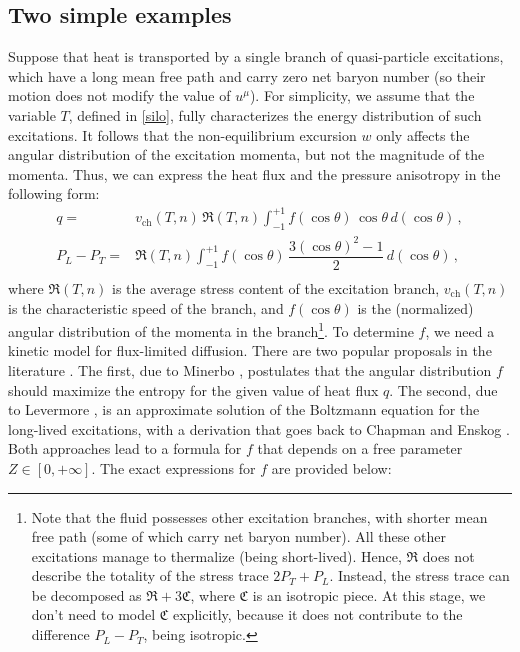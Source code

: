 \documentclass[a4paper, amsfonts, amssymb, amsmath, reprint, showkeys, nofootinbib, twoside, onecolumn, notitlepage]{revtex4-1}
\begin{document}
\subsection{Two simple examples}\label{ortega}

Suppose that heat is transported by a single branch of quasi-particle excitations, which have a long mean free path and carry zero net baryon number (so their motion does not modify the value of $u^\mu$). For simplicity, we assume that the variable $T$, defined in \eqref{silo}, fully characterizes the energy distribution of such excitations. It follows that the non-equilibrium excursion $w$ only affects the angular distribution of the excitation momenta, but not the magnitude of the momenta. Thus, we can express the heat flux and the pressure anisotropy in the following form:
\begin{equation}\label{finalmente}
    \begin{split}
q={}& v_{\text{ch}}(T,n) \, \mathfrak{R}(T,n) \int_{-1}^{+1} f(\cos\theta) \, \cos \theta \,  d (\cos\theta) \, , \\
P_L{-}P_T={}&  \mathfrak{R}(T,n) \int_{-1}^{+1} f(\cos\theta) \, \dfrac{3(\cos \theta)^2{-}1}{2} \, d (\cos\theta) \, , \\
    \end{split}
\end{equation}
where $\mathfrak{R}(T,n)$ is the average stress content of the excitation branch, $v_{\text{ch}}(T,n)$ is the characteristic speed of the branch, and $f(\cos \theta)$ is the (normalized) angular distribution of the momenta in the branch\footnote{Note that the fluid possesses other excitation branches, with shorter mean free path (some of which carry net baryon number). All these other excitations manage to thermalize (being short-lived). Hence, $\mathfrak{R}$ does not describe the totality of the stress trace $2P_T+P_L$. Instead, the stress trace can be decomposed as $\mathfrak{R}+3\mathfrak{C}$, where $\mathfrak{C}$ is an isotropic piece. At this stage, we don't need to model $\mathfrak{C}$ explicitly, because it does not contribute to the difference $P_L-P_T$, being isotropic.}. To determine $f$, we need a kinetic model for flux-limited diffusion. There are two popular proposals in the literature \cite{LEVERMORE1984}. The first, due to Minerbo \cite{MINERBO1978}, postulates that the angular distribution $f$ should maximize the entropy for the given value of heat flux $q$. The second, due to Levermore \cite{Levermore1979,Levermore1981}, is an approximate solution of the Boltzmann equation for the long-lived excitations, with a derivation that goes back to Chapman and Enskog \cite{ChapmanCowling}. Both approaches lead to a formula for $f$ that depends on a free parameter $Z \in [0,+\infty]$. The exact expressions for $f$ are provided below:
\end{document}
